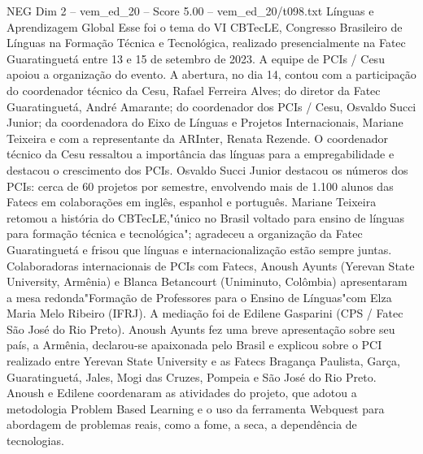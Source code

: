 \begin{textsample}{NEG Dim 2 – vem\_ed\_20 – Score 5.00 – vem\_ed\_20/t098.txt}  \label{ex:f2_neg_090}
Línguas e Aprendizagem Global Esse foi o tema do VI CBTecLE, Congresso Brasileiro de Línguas na Formação Técnica e Tecnológica, realizado presencialmente na Fatec Guaratinguetá entre 13 e 15 de setembro de 2023.
A equipe de PCIs / Cesu apoiou a organização do evento.
A abertura, no dia 14, contou com a participação do coordenador técnico da Cesu, Rafael Ferreira Alves; do diretor da Fatec Guaratinguetá, André Amarante; do coordenador dos PCIs / Cesu, Osvaldo Succi Junior; da coordenadora do Eixo de Línguas e Projetos Internacionais, Mariane Teixeira e com a representante da ARInter, Renata Rezende.
O coordenador técnico da Cesu ressaltou a importância das línguas para a empregabilidade e destacou o crescimento dos PCIs.
Osvaldo Succi Junior destacou os números dos PCIs: cerca de 60 projetos por semestre, envolvendo mais de 1.100 alunos das Fatecs em colaborações em inglês, espanhol e português.
Mariane Teixeira retomou a história do CBTecLE,"único no Brasil voltado para ensino de línguas para formação técnica e tecnológica"; agradeceu a organização da Fatec Guaratinguetá e frisou que línguas e internacionalização estão sempre juntas.
Colaboradoras internacionais de PCIs com Fatecs, Anoush Ayunts (Yerevan State University, Armênia) e Blanca Betancourt (Uniminuto, Colômbia) apresentaram a mesa redonda"Formação de Professores para o Ensino de Línguas"com Elza Maria Melo Ribeiro (IFRJ).
A mediação foi de Edilene Gasparini (CPS / Fatec São José do Rio Preto).
Anoush Ayunts fez uma breve apresentação sobre seu país, a Armênia, declarou-se apaixonada pelo Brasil e explicou sobre o PCI realizado entre Yerevan State University e as Fatecs Bragança Paulista, Garça, Guaratinguetá, Jales, Mogi das Cruzes, Pompeia e São José do Rio Preto.
Anoush e Edilene coordenaram as atividades do projeto, que adotou a metodologia Problem Based Learning e o uso da ferramenta Webquest para abordagem de problemas reais, como a fome, a seca, a dependência de tecnologias.

\end{textsample}
